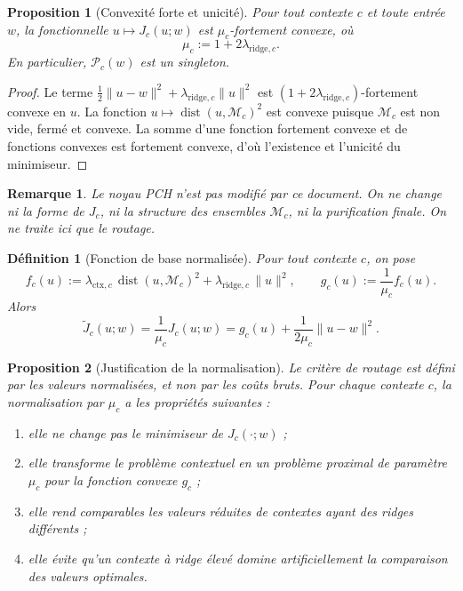 \documentclass[11pt,a4paper]{article}
\newtheorem{definition}{Définition}[section]
\newtheorem{proposition}{Proposition}[section]
\newtheorem{remark}{Remarque}[section]
\DeclareMathOperator{\dist}{dist}
\newcommand{\Mcal}{\mathcal M}
\newcommand{\Pcal}{\mathcal P}
\begin{document}
\begin{proposition}[Convexité forte et unicité]
Pour tout contexte \(c\) et toute entrée \(w\), la fonctionnelle \(u\mapsto J_c(u;w)\) est \(\mu_c\)-fortement convexe, où
\[
\mu_c:=1+2\lambda_{\mathrm{ridge},c}.
\]
En particulier, \(\Pcal_c(w)\) est un singleton.
\end{proposition}

\begin{proof}
Le terme \(\frac12\|u-w\|^2+\lambda_{\mathrm{ridge},c}\|u\|^2\) est \((1+2\lambda_{\mathrm{ridge},c})\)-fortement convexe en \(u\). La fonction \(u\mapsto \dist(u,\Mcal_c)^2\) est convexe puisque \(\Mcal_c\) est non vide, fermé et convexe. La somme d'une fonction fortement convexe et de fonctions convexes est fortement convexe, d'où l'existence et l'unicité du minimiseur.
\end{proof}

\begin{remark}
Le noyau PCH n'est pas modifié par ce document. On ne change ni la forme de \(J_c\), ni la structure des ensembles \(\Mcal_c\), ni la purification finale. On ne traite ici que le routage.
\end{remark}

\begin{definition}[Fonction de base normalisée]
Pour tout contexte \(c\), on pose
\[
f_c(u):=\lambda_{\mathrm{ctx},c}\,\dist(u,\Mcal_c)^2+\lambda_{\mathrm{ridge},c}\,\|u\|^2,
\qquad
g_c(u):=\frac{1}{\mu_c}f_c(u).
\]
Alors
\[
\widetilde J_c(u;w)=\frac{1}{\mu_c}J_c(u;w)
=
 g_c(u)+\frac{1}{2\mu_c}\|u-w\|^2.
\]
\end{definition}

\begin{proposition}[Justification de la normalisation]
Le critère de routage est défini par les valeurs normalisées, et non par les coûts bruts. Pour chaque contexte \(c\), la normalisation par \(\mu_c\) a les propriétés suivantes :
\begin{enumerate}[leftmargin=2em]
\item elle ne change pas le minimiseur de \(J_c(\cdot;w)\) ;
\item elle transforme le problème contextuel en un problème proximal de paramètre \(\mu_c\) pour la fonction convexe \(g_c\) ;
\item elle rend comparables les valeurs réduites de contextes ayant des ridges différents ;
\item elle évite qu'un contexte à ridge élevé domine artificiellement la comparaison des valeurs optimales.
\end{enumerate}
\end{proposition}
\end{document}
